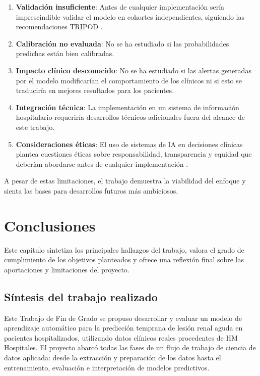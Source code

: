 \documentclass[12pt, a4paper, oneside]{report}
\begin{document}
\begin{enumerate}
    \item \textbf{Validación insuficiente}: Antes de cualquier implementación sería imprescindible validar el modelo en cohortes independientes, siguiendo las recomendaciones TRIPOD \cite{collins2015tripod}.
    \item \textbf{Calibración no evaluada}: No se ha estudiado si las probabilidades predichas están bien calibradas.
    \item \textbf{Impacto clínico desconocido}: No se ha estudiado si las alertas generadas por el modelo modificarían el comportamiento de los clínicos ni si esto se traduciría en mejores resultados para los pacientes.
    \item \textbf{Integración técnica}: La implementación en un sistema de información hospitalario requeriría desarrollos técnicos adicionales fuera del alcance de este trabajo.
    \item \textbf{Consideraciones éticas}: El uso de sistemas de IA en decisiones clínicas plantea cuestiones éticas sobre responsabilidad, transparencia y equidad que deberían abordarse antes de cualquier implementación \cite{char2018implementing}.
\end{enumerate}

A pesar de estas limitaciones, el trabajo demuestra la viabilidad del enfoque y sienta las bases para desarrollos futuros más ambiciosos.

\chapter{Conclusiones}
\label{chap:conclusiones}

Este capítulo sintetiza los principales hallazgos del trabajo, valora el grado de cumplimiento de los objetivos planteados y ofrece una reflexión final sobre las aportaciones y limitaciones del proyecto.

\section{Síntesis del trabajo realizado}

Este Trabajo de Fin de Grado se propuso desarrollar y evaluar un modelo de aprendizaje automático para la predicción temprana de lesión renal aguda en pacientes hospitalizados, utilizando datos clínicos reales procedentes de HM Hospitales. El proyecto abarcó todas las fases de un flujo de trabajo de ciencia de datos aplicada: desde la extracción y preparación de los datos hasta el entrenamiento, evaluación e interpretación de modelos predictivos.
\end{document}
